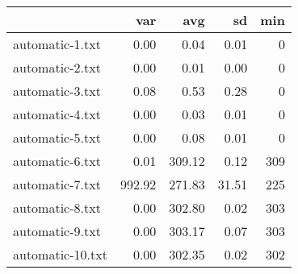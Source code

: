 \begin{tabular}{lrrrr}
  \toprule  & var & avg & sd & min \\ 
  \midrule automatic-1.txt & 0.00 & 0.04 & 0.01 & 0 \\ 
  automatic-2.txt & 0.00 & 0.01 & 0.00 & 0 \\ 
  automatic-3.txt & 0.08 & 0.53 & 0.28 & 0 \\ 
  automatic-4.txt & 0.00 & 0.03 & 0.01 & 0 \\ 
  automatic-5.txt & 0.00 & 0.08 & 0.01 & 0 \\ 
  automatic-6.txt & 0.01 & 309.12 & 0.12 & 309 \\ 
  automatic-7.txt & 992.92 & 271.83 & 31.51 & 225 \\ 
  automatic-8.txt & 0.00 & 302.80 & 0.02 & 303 \\ 
  automatic-9.txt & 0.00 & 303.17 & 0.07 & 303 \\ 
  automatic-10.txt & 0.00 & 302.35 & 0.02 & 302 \\ 
   \bottomrule \end{tabular}
